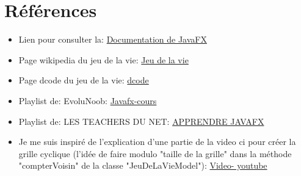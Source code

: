 \documentclass[a4paper,12pt]{article}
\begin{document}
    \section{Références}
    \begin{itemize}
    \item   Lien pour consulter la: \href{https://openjfx.io/}{ Documentation de JavaFX}\\
        \item   Page wikipedia du jeu de la vie: \href{https://fr.wikipedia.org/wiki/Jeu_de_la_vie}{Jeu de la vie}\\
        \item  Page dcode du jeu de la vie: \href{https://www.dcode.fr/jeu-de-la-vie}{dcode}\\
        \item Playlist de: EvoluNoob: \href{https://www.youtube.com/watch?v=I_bpcc6R338&list=PLrSOXFDHBtfGPyx7UHfsJtrdnpa_ix0ah}{Javafx-cours}\\
        \item Playlist de: LES TEACHERS DU NET: \href{https://www.youtube.com/watch?v=02SFViTyX4A&list=PLlxQJeQRaKDSlg_sOFKqBHvFsox2ZVWbs&pp=0gcJCV8EOCosWNin}{APPRENDRE JAVAFX}\\
        \item Je me suis inspiré de l'explication d'une partie de la video ci pour créer la grille cyclique (l'idée de faire modulo "taille de la grille" dans la méthode "compterVoisin" de la classe "JeuDeLaVieModel"): \href{https://youtu.be/NFeXmL_VxvA?t=3424}{Video- youtube}
    \end{itemize}
\end{document}
